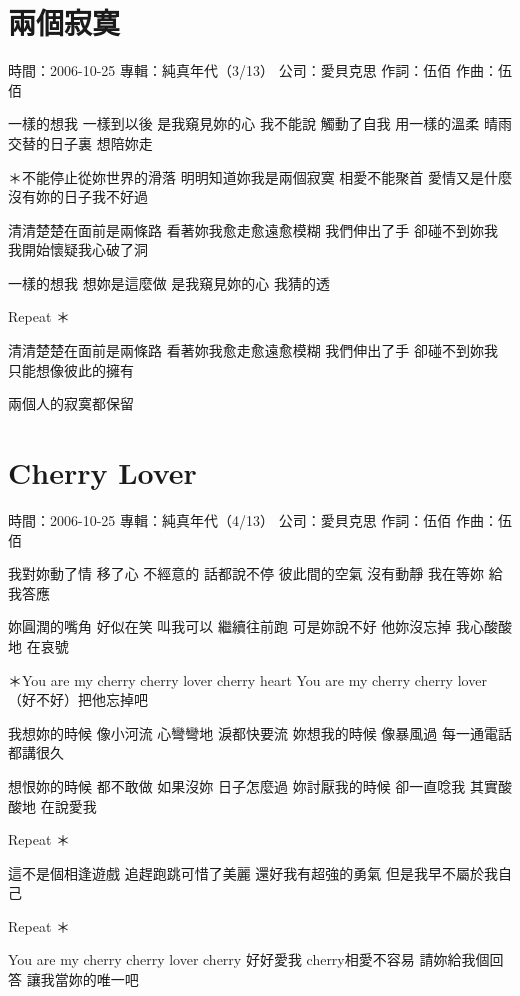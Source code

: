 \documentclass[UTF8,a4paper,oneside,twocolumn,12pt]{ctexbook}
\newcommand{\infopair}[2]{\textbullet #1：#2}
\newcommand{\zc}[1][伍佰]{\infopair{作詞}{#1}}
\newcommand{\zq}[1][伍佰]{\infopair{作曲}{#1}}
\newcommand{\zj}[1]{\infopair{專輯}{#1}}
\newcommand{\sj}[1]{\infopair{時間}{#1}}
\newcommand{\gs}[1]{\infopair{公司}{#1}}
\newenvironment{info}{\begin{flushleft}\kaishu
	}
	{\end{flushleft}\normalsize\yahei\par}
\newenvironment{lyric}{
	}
{}
\begin{document}
\section{兩個寂寞}
\begin{info}
	\sj{2006-10-25}
	\zj{純真年代（3/13）}
	\gs{愛貝克思}
	\zc
	\zq
\end{info}
\begin{lyric}
	一樣的想我 一樣到以後 是我窺見妳的心 我不能說
	觸動了自我 用一樣的溫柔 晴雨交替的日子裏 想陪妳走

	＊不能停止從妳世界的滑落 明明知道妳我是兩個寂寞
	相愛不能聚首 愛情又是什麼 沒有妳的日子我不好過

	清清楚楚在面前是兩條路 看著妳我愈走愈遠愈模糊
	我們伸出了手 卻碰不到妳我 我開始懷疑我心破了洞

	一樣的想我 想妳是這麼做 是我窺見妳的心 我猜的透

	Repeat ＊

	清清楚楚在面前是兩條路 看著妳我愈走愈遠愈模糊
	我們伸出了手 卻碰不到妳我 只能想像彼此的擁有

	兩個人的寂寞都保留
\end{lyric}

\section{Cherry Lover}
\begin{info}
	\sj{2006-10-25}
	\zj{純真年代（4/13）}
	\gs{愛貝克思}
	\zc
	\zq
\end{info}
\begin{lyric}
	我對妳動了情 移了心 不經意的 話都說不停
	彼此間的空氣 沒有動靜 我在等妳 給我答應

	妳圓潤的嘴角 好似在笑 叫我可以 繼續往前跑
	可是妳說不好 他妳沒忘掉 我心酸酸地 在哀號

	＊You are my cherry cherry lover cherry heart
	You are my cherry cherry lover （好不好）把他忘掉吧

	我想妳的時候 像小河流 心彎彎地 淚都快要流
	妳想我的時候 像暴風過 每一通電話 都講很久

	想恨妳的時候 都不敢做 如果沒妳 日子怎麼過
	妳討厭我的時候 卻一直唸我 其實酸酸地 在說愛我

	Repeat ＊

	這不是個相逢遊戲 追趕跑跳可惜了美麗
	還好我有超強的勇氣 但是我早不屬於我自己

	Repeat ＊

	You are my cherry cherry lover cherry 好好愛我
	cherry相愛不容易 請妳給我個回答 讓我當妳的唯一吧
\end{lyric}
\end{document}
